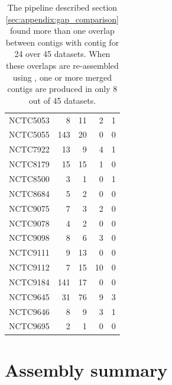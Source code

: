 \documentclass[./main.tex]{subfiles}
\begin{document}
\begin{table}[!htbp]
\begin{tabular}{l|rr|rr}
NCTC5053	&	8	&	11	&	2	&	1	\\
NCTC5055	&	143	&	20	&	0	&	0	\\
NCTC7922	&	13	&	9	&	4	&	1	\\
NCTC8179	&	15	&	15	&	1	&	0	\\
NCTC8500	&	3	&	1	&	0	&	1	\\
NCTC8684	&	5	&	2	&	0	&	0	\\
NCTC9075	&	7	&	3	&	2	&	0	\\
NCTC9078	&	4	&	2	&	0	&	0	\\
NCTC9098	&	8	&	6	&	3	&	0	\\
NCTC9111	&	9	&	13	&	0	&	0	\\
NCTC9112	&	7	&	15	&	10	&	0	\\
NCTC9184	&	141	&	17	&	0	&	0	\\
NCTC9645	&	31	&	76	&	9	&	3	\\
NCTC9646	&	8	&	9	&	3	&	1	\\
NCTC9695	&	2	&	1	&	0	&	0	\\
 \hline
    \end{tabular}
    \caption{
    The pipeline described section \ref{sec:appendix:gap_comparison} found more than one overlap between \canu contigs with \miniasm contig for 24 over 45 datasets. When these overlaps are re-assembled  using \miniasm, one or more merged contigs are produced in only 8 out of 45 datasets.
    }
    \label{tab:appendix:gap_comparison}
\end{table}


\newpage

\section{Assembly summary ~\label{sec:appendix_assembly_summary}}
\end{document}
